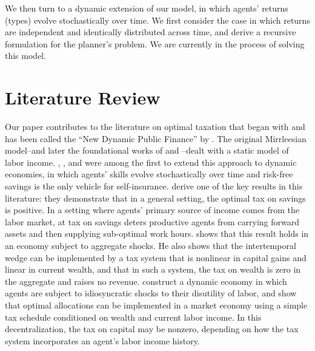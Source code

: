 \documentclass[11pt]{article}
\begin{document}
We then turn to a dynamic extension of our model, in which agents' returns (types) evolve stochastically over time. We first consider the case in which returns are independent and identically distributed across time, and derive a recursive formulation for the planner's problem. We are currently in the process of solving this model. 

\section{Literature Review} \label{sec:lit_rev}


Our paper contributes to the literature on optimal taxation that began with \cite{mirrlees1971exploration} and has been called the ``New Dynamic Public Finance'' by \cite{kocherlakota2010new}. The original Mirrleesian model--and later the foundational works of \cite{diamond1998optimal} and \cite{saez2001using}--dealt with a static model of labor income. \cite{golosov2003optimal}, \cite{kocherlakota2005zero}, and \cite{albanesi2006dynamic} were among the first to extend this approach to dynamic economies, in which agents' skills evolve stochastically over time and risk-free savings is the only vehicle for self-insurance. \cite{golosov2003optimal} derive one of the key results in this literature: they demonstrate that in a general setting, the optimal tax on savings is positive. In a setting where agents' primary source of income comes from the labor market, at tax on savings deters productive agents from carrying forward assets and then supplying sub-optimal work hours. \cite{kocherlakota2005zero} shows that this result holds in an economy subject to aggregate shocks. He also shows that the intertemporal wedge can be implemented by a tax system that is nonlinear in capital gains and linear in current wealth, and that in such a system, the tax on wealth is zero in the aggregate and raises no revenue. \cite{albanesi2006dynamic} construct a dynamic economy in which agents are subject to idiosyncratic shocks to their disutility of labor, and show that optimal allocations can be implemented in a market economy using a simple tax schedule conditioned on wealth and current labor income. In this decentralization, the tax on capital may be nonzero, depending on how the tax system incorporates an agent's labor income history. 
\end{document}
